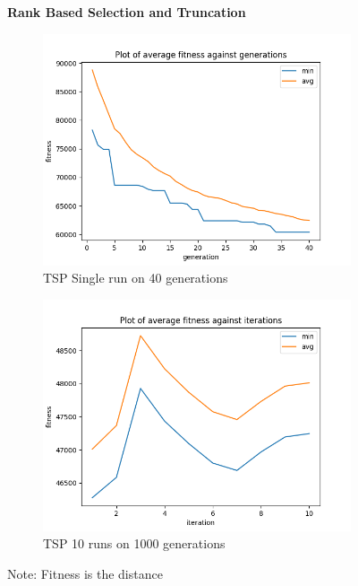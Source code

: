 \documentclass[a4paper]{exam}
\begin{document}
\begin{questions}
  \begin{figure}[H]
    \centering
    \textbf{Rank Based Selection and Truncation}
    \begin{subfigure}{.5\textwidth}
      \centering
      \includegraphics[width=1\linewidth]{images/tsp_rbs_tn_gen.png}
      \caption{TSP Single run on 40 generations}
      \label{fig:tsp_rbs_tn_sub1}
    \end{subfigure}%
    \begin{subfigure}{.5\textwidth}
      \centering
      \includegraphics[width=1\linewidth]{images/tsp_rbs_tn_itr.png}
      \caption{TSP 10 runs on 1000 generations}
      \label{fig:tsp_rbs_tn_sub2}
    \end{subfigure}
    \caption{Note: Fitness is the distance}
    \label{fig:tsp_rbs_tn}
  \end{figure}


\end{questions}
\end{document}
